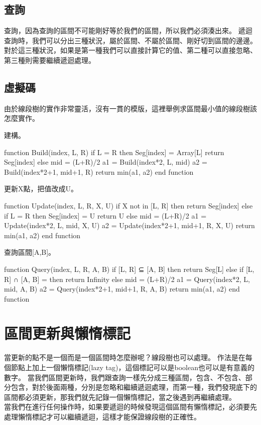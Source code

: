 \documentclass{article}
\begin{document}
\subsection{查詢}
查詢，因為查詢的區間不可能剛好等於我們的區間，所以我們必須湊出來。
遞迴查詢時，我們可以分出三種狀況，屬於區間、不屬於區間、剛好切到區間的邊邊。
對於這三種狀況，如果是第一種我們可以直接計算它的值、第二種可以直接忽略、第三種則需要繼續遞迴處理。


\subsection{虛擬碼}
由於線段樹的實作非常靈活，沒有一貫的模版，這裡舉例求區間最小值的線段樹該怎麼實作。

建構。
\begin{algorithm}[caption={Build}, label={alg1}]
function Build(index, L, R)
    if L = R then
        Seg[index] = Array[L]
        return Seg[index]
    else
        mid = (L+R)/2
        a1 = Build(index*2, L, mid)
        a2 = Build(index*2+1, mid+1, R)
        return min(a1, a2)
end function
\end{algorithm}

更新X點，把值改成U。
\begin{algorithm}[caption={Update}, label={alg1}]
function Update(index, L, R, X, U)
    if X not in [L, R] then
        return Seg[index]
    else if L = R then
        Seg[index] = U
        return U
    else
        mid = (L+R)/2
        a1 = Update(index*2, L, mid, X, U)
        a2 = Update(index*2+1, mid+1, R, X, U)
        return min(a1, a2)
end function
\end{algorithm}

查詢區間[A,B]。
\begin{algorithm}[caption={Query}, label={alg1}]
function Query(index, L, R, A, B)
    if [L, R] ⊆ [A, B] then
        return Seg[L]
    else if [L, R] ∩ [A, B] = {} then
        return Infinity
    else
        mid = (L+R)/2
        a1 = Query(index*2, L, mid, A, B)
        a2 = Query(index*2+1, mid+1, R, A, B)
        return min(a1, a2)
end function
\end{algorithm}

\section{區間更新與懶惰標記}
當更新的點不是一個而是一個區間時怎麼辦呢？線段樹也可以處理。
作法是在每個節點上加上一個懶惰標記(lazy tag)，這個標記可以是boolean也可以是有意義的數字。
當我們區間更新時，我們跟查詢一樣先分成三種區間，包含、不包含、部分包含，對於後面兩種，分別是忽略和繼續遞迴處理，而第一種，我們發現底下的區間都必須更新，那我們就先記錄一個懶惰標記，當之後遇到再繼續處理。\\
當我們在進行任何操作時，如果要遞迴的時候發現這個區間有懶惰標記，必須要先處理懶惰標記才可以繼續遞迴，這樣才能保證線段樹的正確性。
\end{document}
